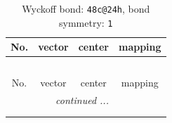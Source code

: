 \documentclass[fleqn,8pt]{jsarticle}
\begin{document}
\renewcommand{\arraystretch}{1.2}
\begin{longtable}{cccc}
\caption{Wyckoff bond: {\tt 48c@24h}, bond symmetry: {\tt 1}}
 \\
 \hline \hline
No. & vector & center & mapping \\ \hline \endfirsthead

\multicolumn{3}{l}{\tablename\ \thetable{}} \\
 \hline \hline
No. & vector & center & mapping \\ \hline \endhead

 \hline \hline
\multicolumn{3}{r}{\footnotesize\it continued ...} \\ \endfoot

 \hline \hline
\multicolumn{3}{r}{} \\ \endlastfoot


\end{longtable}
\end{document}
